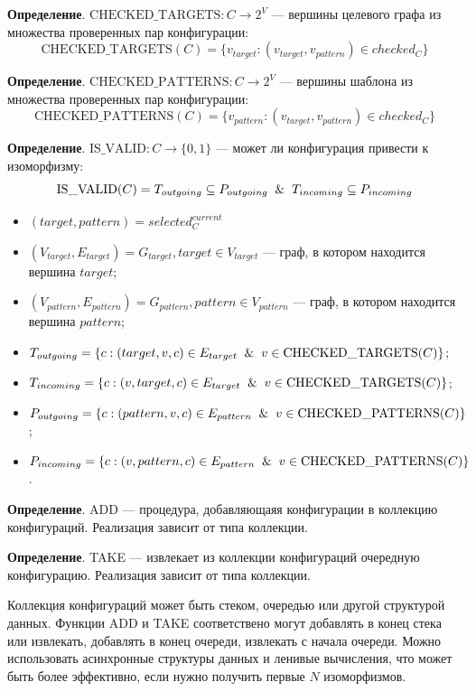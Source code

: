 \textbf{Определение}. $\textrm{CHECKED\_TARGETS} : C \to 2^V$ --- вершины целевого графа из множества проверенных пар конфигурации:
%
$$\textrm{CHECKED\_TARGETS}(C) = \{ v_{target} : ( v_{target}, v_{pattern} ) \in checked_C \}$$

\textbf{Определение}. $\textrm{CHECKED\_PATTERNS} : C \to 2^V$ --- вершины шаблона из множества проверенных пар конфигурации:
%
$$\textrm{CHECKED\_PATTERNS}(C) = \{ v_{pattern} : ( v_{target}, v_{pattern} ) \in checked_C \}$$

\textbf{Определение}. $\textrm{IS\_VALID} : C \to \{ 0, 1 \}$ --- может ли конфигурация привести к изоморфизму:
%
$$\textrm{IS\_VALID}(C) = T_{outgoing} \subseteq P_{outgoing} \And T_{incoming} \subseteq P_{incoming} $$
%
\begin{itemize}
\item $(target, pattern) = selected^{current}_C$
\item $(V_{target}, E_{target}) = G_{target}, target \in V_{target}$ --- граф, в котором находится вершина $target$;
\item $(V_{pattern}, E_{pattern}) = G_{pattern}, pattern \in V_{pattern}$ --- граф, в котором находится вершина $pattern$;
\item $T_{outgoing} = \{ c : ( target, v, c ) \in E_{target} \And v \in \textrm{CHECKED\_TARGETS}(C) \} $;
\item $T_{incoming} = \{ c : ( v, target, c ) \in E_{target} \And v \in \textrm{CHECKED\_TARGETS}(C) \} $;
\item $P_{outgoing} = \{ c : ( pattern, v, c ) \in E_{pattern} \And v \in \textrm{CHECKED\_PATTERNS}(C) \} $;
\item $P_{incoming} = \{ c : ( v, pattern, c ) \in E_{pattern} \And v \in \textrm{CHECKED\_PATTERNS}(C) \} $.
\end{itemize}

\textbf{Определение}. ADD --- процедура, добавляющаяя конфигурации в
коллекцию конфигураций. Реализация зависит от типа коллекции.

\textbf{Определение}. TAKE --- извлекает из коллекции конфигураций
очередную конфигурацию. Реализация зависит от типа коллекции.

Коллекция конфигураций может быть стеком, очередью или другой структурой данных.
Функции ADD и TAKE соответствено могут добавлять в конец стека или извлекать,
добавлять в конец очереди, извлекать с начала очереди.
Можно использовать асинхронные структуры данных и ленивые вычисления,
что может быть более эффективно, если нужно получить первые $N$ изоморфизмов.

